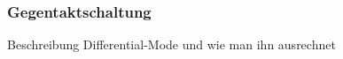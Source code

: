 \subsubsection{Gegentaktschaltung} \label{subsec:gegentakt}
Beschreibung Differential-Mode und wie man ihn ausrechnet